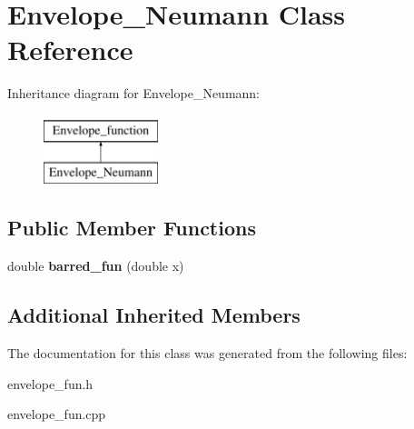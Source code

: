 \hypertarget{classEnvelope__Neumann}{}\section{Envelope\+\_\+\+Neumann Class Reference}
\label{classEnvelope__Neumann}
Inheritance diagram for Envelope\+\_\+\+Neumann\+:\begin{figure}[H]
\begin{center}
\leavevmode
\includegraphics[height=2.000000cm]{classEnvelope__Neumann}
\end{center}
\end{figure}
\subsection*{Public Member Functions}
\begin{DoxyCompactItemize}
\item 
\mbox{\label{classEnvelope__Neumann_a008d9cb4aa5c9bd8d507f9d502a4e020}} 
double {\bfseries barred\+\_\+fun} (double x)
\end{DoxyCompactItemize}
\subsection*{Additional Inherited Members}


The documentation for this class was generated from the following files\+:\begin{DoxyCompactItemize}
\item 
envelope\+\_\+fun.\+h\item 
envelope\+\_\+fun.\+cpp\end{DoxyCompactItemize}
